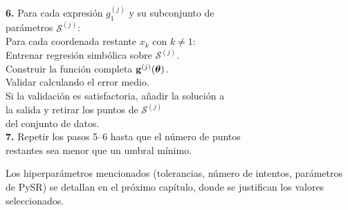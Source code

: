 \begin{tabbing}
\textbf{6.} \> Para cada expresión \(g_1^{(j)}\) y su subconjunto de \\
\> parámetros \(\mathcal{S}^{(j)}\): \\
\> \qquad Para cada coordenada restante \(x_k\) con \(k \neq 1\): \\
\> \qquad \qquad Entrenar regresión simbólica sobre \(\mathcal{S}^{(j)}\). \\
\> \qquad Construir la función completa \(\mathbf{g}^{(j)}(\boldsymbol{\theta})\). \\
\> \qquad Validar calculando el error medio. \\
\> \qquad Si la validación es satisfactoria, añadir la solución a \\
\> \qquad la salida y retirar los puntos de \(\mathcal{S}^{(j)}\) \\
\> \qquad del conjunto de datos. \\
\textbf{7.} \> Repetir los pasos 5--6 hasta que el número de puntos \\
\> restantes sea menor que un umbral mínimo. \end{tabbing} \medskip

Los hiperparámetros mencionados (tolerancias, número de intentos, parámetros de PySR) se detallan en el próximo capítulo, donde se justifican los valores seleccionados.
